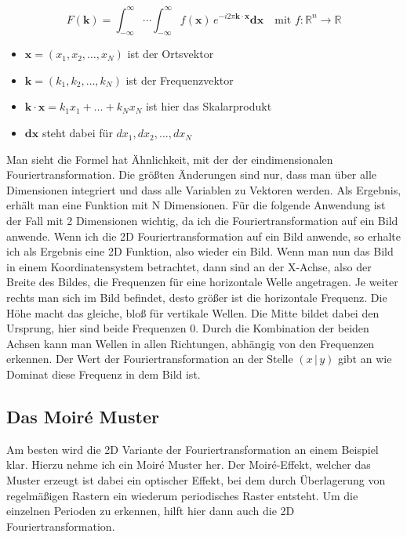 \documentclass[a4paper,12pt]{article}
\theoremstyle{definition}
\theoremstyle{remark}
\begin{document}
$$F(\mathbf{k}) = \int_{-\infty}^{\infty} \cdots \int_{-\infty}^{\infty} {f(\mathbf{x}) \, e^{-i2\pi \mathbf{k} \cdot \mathbf{x}} \mathbf{dx}} \quad \text{mit } f:\mathbb{R}^n \to \mathbb{R}$$
\begin{itemize}
  \item $\mathbf{x} = (x_1, x_2, \ldots, x_N)$ ist der Ortsvektor
  \item $\mathbf{k} = (k_1, k_2, \ldots, k_N)$ ist der Frequenzvektor
  \item $\mathbf{k} \cdot \mathbf{x} = k_1x_1 + \dots + k_Nx_N$ ist hier das Skalarprodukt
  \item $\mathbf{dx}$ steht dabei für $dx_1, dx_2, ..., dx_N$
\end{itemize}

Man sieht die Formel hat Ähnlichkeit, mit der der eindimensionalen Fouriertransformation. Die größten Änderungen sind nur, dass man über alle 
Dimensionen integriert und dass alle Variablen zu Vektoren werden. Als Ergebnis, erhält man eine Funktion mit N Dimensionen. Für die folgende 
Anwendung ist der Fall mit 2 Dimensionen wichtig, da ich die Fouriertransformation auf ein Bild anwende. Wenn ich die 2D Fouriertransformation 
auf ein Bild anwende, so erhalte ich als Ergebnis eine 2D Funktion, also wieder ein Bild. Wenn man nun das Bild in einem Koordinatensystem betrachtet,
dann sind an der X-Achse, also der Breite des Bildes, die Frequenzen für eine horizontale Welle angetragen. Je weiter rechts man sich im Bild befindet,
desto größer ist die horizontale Frequenz. Die Höhe macht das gleiche, bloß für vertikale Wellen. Die Mitte bildet dabei den Ursprung, hier sind beide 
Frequenzen 0. Durch die Kombination der beiden Achsen kann man Wellen in allen Richtungen, abhängig von den Frequenzen erkennen. Der Wert der 
Fouriertransformation an der Stelle $(x\,|\,y)$ gibt an wie Dominat diese Frequenz in dem Bild ist. 
\subsection{Das Moiré Muster}
Am besten wird die 2D Variante der Fouriertransformation an einem Beispiel klar. Hierzu nehme ich ein Moiré Muster her. Der Moiré-Effekt, welcher 
das Muster erzeugt ist dabei ein optischer Effekt, bei dem durch Überlagerung von regelmäßigen Rastern ein wiederum periodisches Raster entsteht.
Um die einzelnen Perioden zu erkennen, hilft hier dann auch die 2D Fouriertransformation.
\end{document}
